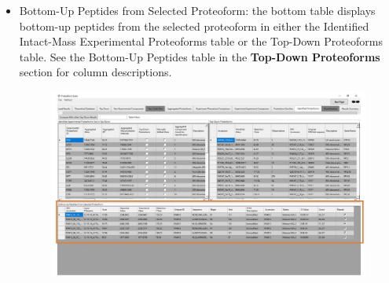 \begin{itemize}
\begin{figure}[h]
\end{figure}
\item Bottom-Up Peptides from Selected Proteoform: the bottom table displays bottom-up peptides from the selected proteoform in either the Identified Intact-Mass Experimental Proteoforms table or the Top-Down Proteoforms table. See the Bottom-Up Peptides table in the \textbf{Top-Down Proteoforms} section for column descriptions.
	\begin{figure}[h]
\centering
\includegraphics[scale=0.45]{figures/identified3.jpg}
\end{figure}
\end{itemize}